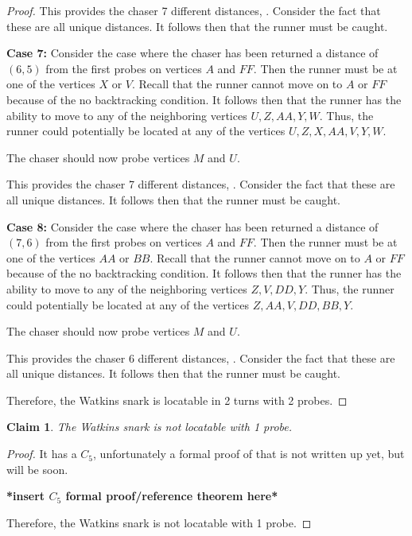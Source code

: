 \documentclass[11pt]{article}
\newtheorem{clm}{Claim}
\begin{document}
\begin{proof}
		This provides the chaser 7 different distances, . Consider the fact that these are all unique distances. It follows then that the runner must be caught.
		
		\textbf{Case 7:} Consider the case where the chaser has been returned a distance of $(6,5)$ from the first probes on vertices $A$ and $FF$. Then the runner must be at one of the vertices $X$ or $V$. Recall that the runner cannot move on to $A$ or $FF$ because of the no backtracking condition. It follows then that the runner has the ability to move to any of the neighboring vertices $U,Z,AA,Y,W$. Thus, the runner could potentially be located at any of the vertices $U,Z,X,AA,V,Y,W$.
		
		The chaser should now probe vertices $M$ and $U$.
		
		This provides the chaser 7 different distances, . Consider the fact that these are all unique distances. It follows then that the runner must be caught.
		
		\textbf{Case 8:} Consider the case where the chaser has been returned a distance of $(7,6)$ from the first probes on vertices $A$ and $FF$. Then the runner must be at one of the vertices $AA$ or $BB$. Recall that the runner cannot move on to $A$ or $FF$ because of the no backtracking condition. It follows then that the runner has the ability to move to any of the neighboring vertices $Z,V,DD,Y$. Thus, the runner could potentially be located at any of the vertices $Z,AA,V,DD,BB,Y$.
		
		The chaser should now probe vertices $M$ and $U$.
		
		This provides the chaser 6 different distances, . Consider the fact that these are all unique distances. It follows then that the runner must be caught.
		
		Therefore, the Watkins snark is locatable in 2 turns with 2 probes.
	\end{proof}
	\begin{clm}
		The Watkins snark is not locatable with 1 probe.
	\end{clm}
	\begin{proof}
		It has a $C_5$, unfortunately a formal proof of that is not written up yet, but will be soon.
		
		\textbf{*insert $C_5$ formal proof/reference theorem here*}
		
		Therefore, the Watkins snark is not locatable with 1 probe.
	\end{proof}
\end{document}
